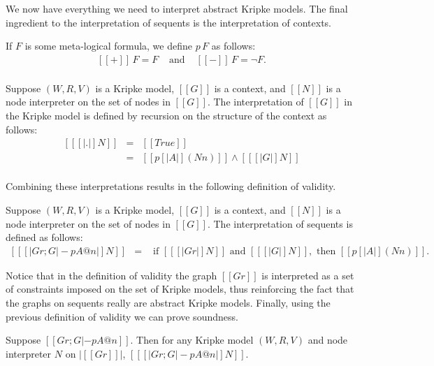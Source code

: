 We now have everything we need to interpret abstract Kripke
models. The final ingredient to the interpretation of sequents is the
interpretation of contexts.  
\begin{definition}
  \label{def:pol_interp}
  If $F$ is some meta-logical formula, we define $p\, F$ as follows:
  \[
  \begin{array}{lll}
    [[+]]\, F = F & \text{ and } &
    [[-]]\, F = \lnot F.\\
  \end{array}
  \]
\end{definition}
\begin{definition}
  \label{def:ctx_interp}
  Suppose $(W, R, V)$ is a Kripke model, $[[G]]$ is a context, 
  and $[[N]]$ is a node interpreter on the set of nodes in $[[G]]$.
  The interpretation of
  $[[G]]$ in the Kripke model is defined by recursion on the structure
  of the context as follows:
  \[
  \begin{array}{lll}
    [[ [| . |] N ]]        & = & [[True]]\\
    [[ [| p A @ n, G |] N]] & = & [[ p [| A |] (N n) ]] \land [[ [| G |] N]]\\
  \end{array}
  \]
\end{definition}
Combining these interpretations results in the following
definition of validity.
\begin{definition}
  \label{def:validity}
  Suppose $(W, R, V)$ is a Kripke model, $[[G]]$ is a context, 
  and $[[N]]$ is a node interpreter on the set of nodes in $[[G]]$.
  The interpretation of sequents is defined as follows:
  \[
  \begin{array}{lll}
    [[ [|Gr ; G |- p A @ n |] N ]] & = & \text{ if } [[ [| Gr |] N ]] \text{ and } [[ [| G |] N]], \text{ then } [[ p [| A |] (N n)]].
  \end{array}
  \]
\end{definition}
Notice that in the definition of validity the graph $[[Gr]]$ is
interpreted as a set of constraints imposed on the set of Kripke models, thus
reinforcing the fact that the graphs on sequents really are abstract
Kripke models.  Finally, using the previous definition of validity we
can prove soundness.
\begin{thm}[Soundness]
  \label{thm:consistency}
  Suppose $[[Gr ; G |-p A @ n]]$. 
  Then for any Kripke model $(W, R, V)$ and node interpreter $N$ on $|[[Gr]]|$, $[[ [|Gr ; G |- p A @ n |] N]]$.
\end{thm}

